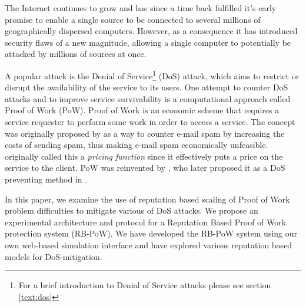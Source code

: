 The Internet continues to grow and has since a time back fulfilled it's early promise to enable a single source to be connected to several millions of geographically dispersed computers. However, as a consequence it has introduced security flaws of a new magnitude, allowing a single computer to potentially be attacked by millions of sources at once.

A popular attack is the Denial of Service\footnote{For a brief introduction to Denial of Service attacks please see section \ref{text:dos}} (DoS) attack, which aims to restrict or disrupt the availability of the service to its users.
One attempt to counter DoS attacks and to improve service survivability is a computational approach called Proof of Work (PoW).
Proof of Work is an economic scheme that requires a service requester to perform some work in order to access a service.
The concept was originally proposed by \citeauthor{DworkN92}\cite{DworkN92} as a way to counter e-mail spam by increasing the costs of sending spam, thus making e-mail spam economically unfeasible.
\citeauthor{DworkN92} originally called this a \emph{pricing function} since it effectively puts a price on the service to the client.
PoW was reinvented by \citeauthor{Back02}, who later proposed it as a DoS preventing method in . 

In this paper, we examine the use of reputation based scaling of Proof of Work problem difficulties to mitigate various of DoS attacks. We propose an experimental architecture and protocol for a Reputation Based Proof of Work protection system (RB-PoW). We have developed the RB-PoW system using our own web-based simulation interface and have explored various reputation based models for DoS-mitigation.

 





